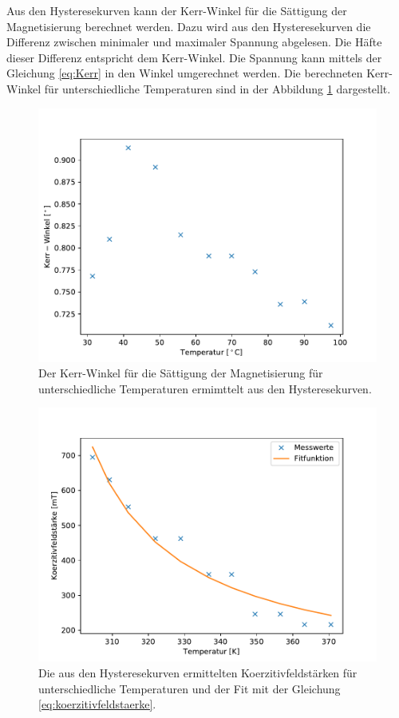 Aus den Hysteresekurven kann der Kerr-Winkel für die Sättigung der Magnetisierung berechnet werden.
Dazu wird aus den Hysteresekurven die Differenz zwischen minimaler und maximaler Spannung abgelesen.
Die Häfte dieser Differenz entspricht dem Kerr-Winkel.
Die Spannung kann mittels der Gleichung \eqref{eq:Kerr} in den Winkel umgerechnet werden.
Die berechneten Kerr-Winkel für unterschiedliche Temperaturen sind in der Abbildung \ref{fig:Kerr_Winkel} dargestellt.
\begin{figure}[H]
\centering
\includegraphics[scale=0.8]{../Messdaten/auswertung/Kerr_Winkel.pdf}
\caption{Der Kerr-Winkel für die Sättigung der Magnetisierung für unterschiedliche Temperaturen ermimttelt aus den Hysteresekurven.}
\label{fig:Kerr_Winkel}
\end{figure}


\begin{figure}[H]
\centering
\includegraphics[scale=0.8]{../Messdaten/auswertung/Kompensationstemperatur.pdf}
\caption{Die aus den Hysteresekurven ermittelten Koerzitivfeldstärken für unterschiedliche Temperaturen 
und der Fit mit der Gleichung \eqref{eq:koerzitivfeldstaerke}.}
\label{fig:koerzitivfeldstaerke}
\end{figure}

